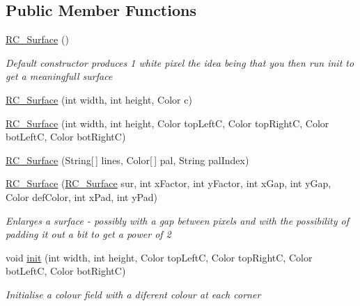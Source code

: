 \subsection*{Public Member Functions}
\begin{DoxyCompactItemize}
\item 
\mbox{\hyperlink{class_r_c___framework_1_1_r_c___surface_aa0ebfc848c2efcf738168ba4ae24a700}{R\+C\+\_\+\+Surface}} ()
\begin{DoxyCompactList}\small\item\em Default constructor produces 1 white pixel the idea being that you then run init to get a meaningfull surface \end{DoxyCompactList}\item 
\mbox{\hyperlink{class_r_c___framework_1_1_r_c___surface_a8cf9c7bd5f30e2ce9a6fe58fb64cd301}{R\+C\+\_\+\+Surface}} (int width, int height, Color c)
\item 
\mbox{\hyperlink{class_r_c___framework_1_1_r_c___surface_ada89bd248fe4aea65a1cd8f579f17fa1}{R\+C\+\_\+\+Surface}} (int width, int height, Color top\+LeftC, Color top\+RightC, Color bot\+LeftC, Color bot\+RightC)
\item 
\mbox{\hyperlink{class_r_c___framework_1_1_r_c___surface_ad5778d6547c7ecca1f0c35264a71f7d5}{R\+C\+\_\+\+Surface}} (String\mbox{[}$\,$\mbox{]} lines, Color\mbox{[}$\,$\mbox{]} pal, String pal\+Index)
\item 
\mbox{\hyperlink{class_r_c___framework_1_1_r_c___surface_ac79ed2e2afed744ec647c8e3587bfc17}{R\+C\+\_\+\+Surface}} (\mbox{\hyperlink{class_r_c___framework_1_1_r_c___surface}{R\+C\+\_\+\+Surface}} sur, int x\+Factor, int y\+Factor, int x\+Gap, int y\+Gap, Color def\+Color, int x\+Pad, int y\+Pad)
\begin{DoxyCompactList}\small\item\em Enlarges a surface -\/ possibly with a gap between pixels and with the possibility of padding it out a bit to get a power of 2 \end{DoxyCompactList}\item 
void \mbox{\hyperlink{class_r_c___framework_1_1_r_c___surface_a88c34f3e232de3dd02f82c3145239553}{init}} (int width, int height, Color top\+LeftC, Color top\+RightC, Color bot\+LeftC, Color bot\+RightC)
\begin{DoxyCompactList}\small\item\em Initialise a colour field with a diferent colour at each corner \end{DoxyCompactList}\item 

\end{DoxyCompactItemize}
